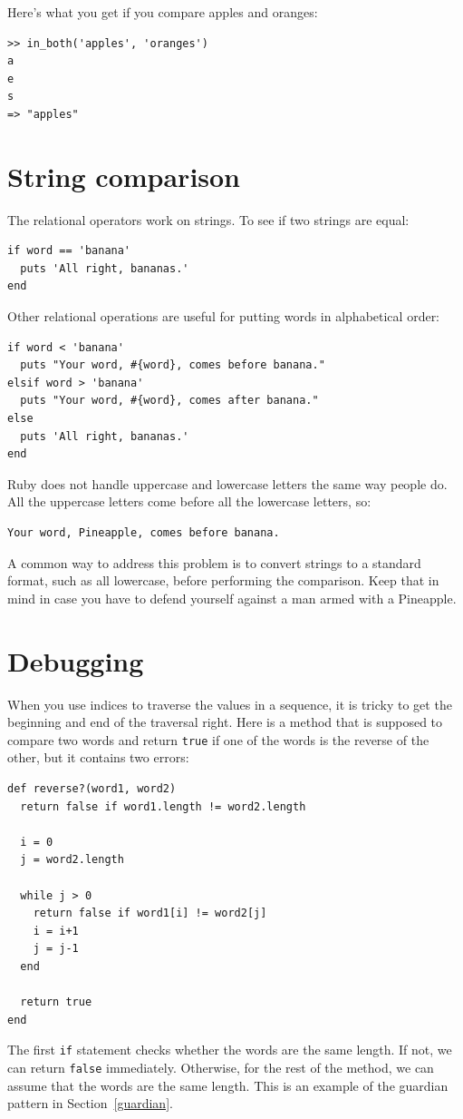\documentclass[10pt]{book}
\begin{document}
Here's what you get if you compare apples and oranges:

\begin{verbatim}
>> in_both('apples', 'oranges')
a
e
s
=> "apples"
\end{verbatim}
%

\section{String comparison}

The relational operators work on strings.  To see if two strings are equal:

\begin{verbatim}
if word == 'banana'
  puts 'All right, bananas.'
end
\end{verbatim}
%
Other relational operations are useful for putting words in alphabetical
order:

\begin{verbatim}
if word < 'banana'
  puts "Your word, #{word}, comes before banana."
elsif word > 'banana'
  puts "Your word, #{word}, comes after banana."
else
  puts 'All right, bananas.'
end
\end{verbatim}
%
Ruby does not handle uppercase and lowercase letters the same way
people do.  All the uppercase letters come before all the
lowercase letters, so:

\begin{verbatim}
Your word, Pineapple, comes before banana.
\end{verbatim}
%
A common way to address this problem is to convert strings to a
standard format, such as all lowercase, before performing the
comparison.  Keep that in mind in case you have to defend yourself
against a man armed with a Pineapple.


\section{Debugging}

When you use indices to traverse the values in a sequence,
it is tricky to get the beginning and end of the traversal
right.  Here is a method that is supposed to compare two
words and return {\tt true} if one of the words is the reverse
of the other, but it contains two errors:

\begin{verbatim}
def reverse?(word1, word2)
  return false if word1.length != word2.length
  
  i = 0
  j = word2.length

  while j > 0
    return false if word1[i] != word2[j]
    i = i+1
    j = j-1
  end

  return true
end
\end{verbatim}
%
The first {\tt if} statement checks whether the words are the
same length.  If not, we can return {\tt false} immediately.
Otherwise, for the rest of the method, we can assume that the words
are the same length.  This is an example of the guardian pattern
in Section~\ref{guardian}.
\end{document}

